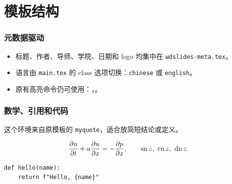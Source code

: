 \section{模板结构}

\begin{frame}
  \frametitle{元数据驱动}
  \begin{itemize}
    \item 标题、作者、导师、学院、日期和 logo 均集中在 \texttt{wdslides-meta.tex}。
    \item 语言由 \texttt{main.tex} 的 class 选项切换：\texttt{chinese} 或 \texttt{english}。
    \item 原有高亮命令仍可使用：，。
  \end{itemize}
\end{frame}

\begin{frame}[fragile]
  \frametitle{数学、引用和代码}
  \begin{myquote}
    这个环境来自原模板的 \texttt{myquote}，适合放简短结论或定义。
  \end{myquote}

  \begin{equation}
    \frac{\partial u}{\partial t} + u\frac{\partial u}{\partial x} = -\frac{\partial p}{\partial x},\qquad
    \operatorname{sn} z,\ \operatorname{cn} z,\ \operatorname{dn} z
  \end{equation}

  \begin{lstlisting}[style=python]
def hello(name):
    return f"Hello, {name}"
  \end{lstlisting}
\end{frame}
